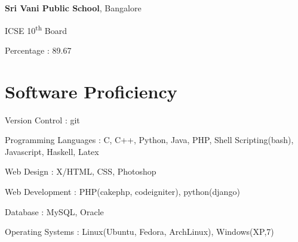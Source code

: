 \begin{resume}
{\bf \textsf{Sri Vani Public School}}, Bangalore\\
\vspace*{-.1in}
\begin{list1}
\item[] ICSE 10\textsuperscript{th} Board \qquad
\begin{list2}
\item  Percentage : 89.67
\end{list2}
\end{list1}






\section{\sc Software Proficiency}
\begin{list2}
 \item Version Control : git
 \item Programming Languages : C, C++, Python, Java, PHP, Shell Scripting(bash), Javascript, Haskell, Latex
 \item Web Design : X/HTML, CSS, Photoshop
 \item Web Development : PHP(cakephp, codeigniter), python(django) 
 \item Database : MySQL, Oracle
 \item Operating Systems : Linux(Ubuntu, Fedora, ArchLinux), Windows(XP,7)
 \end{list2}



\end{resume}
